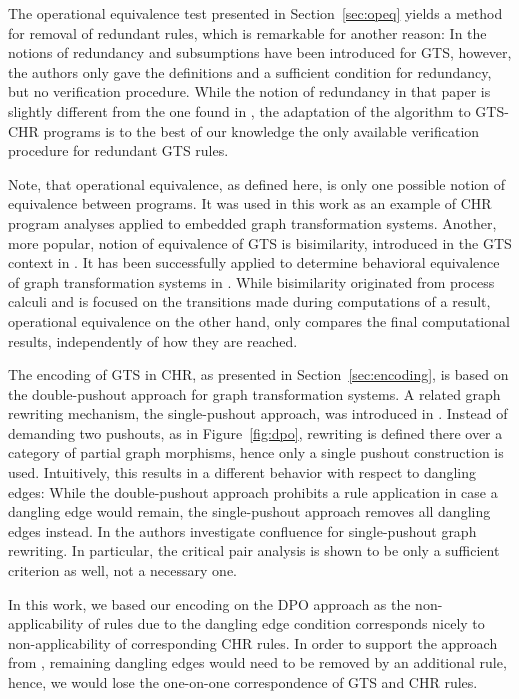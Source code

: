 \documentclass{tlp}
\begin{document}
The operational equivalence test presented in Section~\ref{sec:opeq} yields a
method for removal of redundant rules, which is remarkable for another reason: In
\cite{Kreowski2000} the notions of redundancy and subsumptions have been
introduced for GTS, however, the authors only gave the definitions and a
sufficient condition for redundancy, but no verification procedure. While the
notion of redundancy in that paper is slightly different from the one found in
\cite{Abdennadher2003}, the adaptation of the algorithm to GTS-CHR programs is to
the best of our knowledge the only available verification procedure for redundant
GTS rules.

Note, that operational equivalence, as defined here, is only one possible notion
of equivalence between programs. It was used in this work as an example of CHR
program analyses applied to embedded graph transformation systems. Another, more
popular, notion of equivalence of GTS is bisimilarity, introduced in the GTS
context in \cite{Ehrig2004}. It has been successfully applied to determine
behavioral equivalence of graph transformation systems in \cite{Rangel2008}.
While bisimilarity originated from process calculi and is focused on the
transitions made during computations of a result, operational equivalence on the
other hand, only compares the final computational results, independently of how
they are reached.

The encoding of GTS in CHR, as presented in Section~\ref{sec:encoding}, is based
on the double-pushout approach for graph transformation systems. A related graph
rewriting mechanism, the single-pushout approach, was introduced in
\cite{loewe93}. Instead of demanding two pushouts, as in Figure~\ref{fig:dpo},
rewriting is defined there over a category of partial graph morphisms, hence only
a single pushout construction is used. Intuitively, this results in a different
behavior with respect to dangling edges: While the double-pushout approach
prohibits a rule application in case a dangling edge would remain, the
single-pushout approach removes all dangling edges instead. In \cite{Lowe1993}
the authors investigate confluence for single-pushout graph rewriting. In
particular, the critical pair analysis is shown to be only a sufficient criterion
as well, not a necessary one.

In this work, we based our encoding on the DPO approach as the non-applicability
of rules due to the dangling edge condition corresponds nicely to
non-applicability of corresponding CHR rules. In order to support the approach
from \cite{loewe93}, remaining dangling edges would need to be removed by an
additional rule, hence, we would lose the one-on-one correspondence of GTS and
CHR rules.
\end{document}
